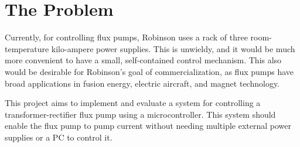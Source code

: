 \documentclass[11pt, a4paper, twoside, openright]{article}
\begin{document}
\section{The Problem}
Currently, for controlling flux pumps, Robinson uses a rack of three room-temperature kilo-ampere power supplies. This is unwieldy, and it would be much more convenient to have a small, self-contained control mechanism. This also would be desirable for Robinson's goal of commercialization, as flux pumps have broad applications in fusion energy, electric aircraft, and magnet technology.

This project aims to implement and evaluate a system for controlling a transformer-rectifier flux pump using a microcontroller. This system should enable the flux pump to pump current without needing multiple external power supplies or a PC to control it.





\end{document}
